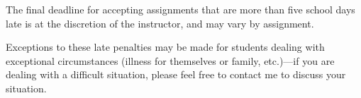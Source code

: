\documentclass[12pt]{article}
\begin{document}
The final deadline for accepting assignments that are more than five school days late is at the discretion of the instructor, and may vary by assignment. 

Exceptions to these late penalties may be made for students dealing with exceptional circumstances (illness for themselves or family, etc.)—if you are dealing with a difficult situation, please feel free to contact me to discuss your situation.

%
%
%
%


\end{document}

